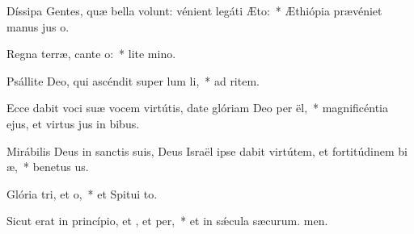 \item Díssipa Gentes, quæ bella volunt: vénient legáti  Æto:~* Æthiópia prævéniet manus jus o.
\item Regna terræ, cante o:~* lite mino.
\item Psállite Deo, qui ascéndit super lum li,~* ad ritem.
\item Ecce dabit voci suæ vocem virtútis, date glóriam Deo per ël,~* magnificéntia ejus, et virtus jus in bibus.
\item Mirábilis Deus in sanctis suis, Deus Israël ipse dabit virtútem, et fortitúdinem bi æ,~* benetus us.
\item Glória tri, et o,~* et Spitui to.
\item Sicut erat in princípio, et , et per,~* et in sǽcula sæcurum. men.
